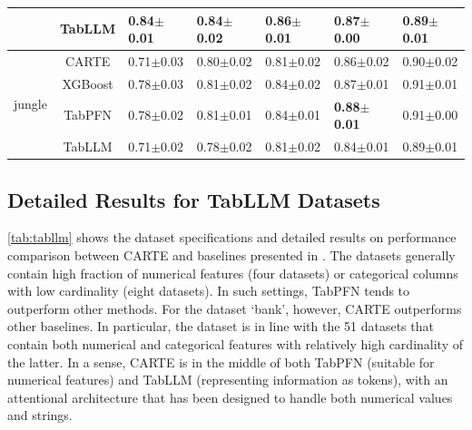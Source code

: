 \documentclass{article}
\theoremstyle{plain}
\theoremstyle{definition}
\theoremstyle{remark}
\begin{document}
\begin{table}[!p]
\begin{center}
\begin{tabular}{cclllll}
& TabLLM & 0.84$\pm$0.01 & 0.84$\pm$0.02 & \textbf{0.86$\pm$0.01} & 0.87$\pm$0.00 & \textbf{0.89$\pm$0.01} \\
\midrule
\multirow{4}{*}{jungle} & CARTE & 0.71$\pm$0.03 &   0.80$\pm$0.02 &  0.81$\pm$0.02 &  0.86$\pm$0.02 &   0.90$\pm$0.02 \\
& XGBoost & 0.78$\pm$0.03 & 0.81$\pm$0.02 & 0.84$\pm$0.02 & 0.87$\pm$0.01 & 0.91$\pm$0.01 \\
& TabPFN & 0.78$\pm$0.02 & 0.81$\pm$0.01 & 0.84$\pm$0.01 & \textbf{0.88$\pm$0.01} & 0.91$\pm$0.00 \\
& TabLLM & 0.71$\pm$0.02 & 0.78$\pm$0.02 & 0.81$\pm$0.02 & 0.84$\pm$0.01 & 0.89$\pm$0.01 \\
\bottomrule
\end{tabular}
\end{center}
\end{table}


\subsection{Detailed Results for TabLLM Datasets}\label{app:tabllm_all}
\autoref{tab:tabllm} shows the dataset specifications and detailed results on performance comparison between CARTE and baselines presented in \citet{hegselmannTabLLMFewshotClassification2023}. The datasets generally contain high fraction of numerical features (four datasets) or categorical columns with low cardinality (eight datasets). In such settings, TabPFN tends to outperform other methods. For the dataset `bank', however, CARTE outperforms other baselines. In particular, the dataset is in line with the 51 datasets that contain both numerical and categorical features with relatively high cardinality of the latter. In a sense, CARTE is in the middle of both TabPFN (suitable for numerical features) and TabLLM (representing information as tokens), with an attentional architecture that has been designed to handle both numerical values and strings.
\end{document}
